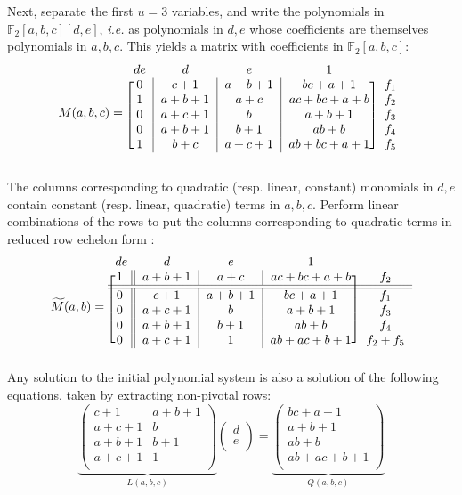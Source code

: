 \documentclass[twoside,leqno]{article}
\begin{document}
Next, separate the first $u=3$ variables, and write the polynomials in
$\mathbb{F}_2[a,b,c][d,e]$, \textit{i.e.} as polynomials in $d, e$ whose
coefficients are themselves polynomials in $a, b, c$. This yields a matrix with
coefficients in $\mathbb{F}_2[a,b,c]$:
\begin{equation}
\label{eq:example_matrix}
M(a,b,c) = \begin{blockarray}{ccccc}
de & d & e & 1 & \\
\begin{block}{[c|c|c|c]c}
0 & c+1 & a+b+1 & bc + a + 1 & f_1\\
1 & a+b+1 & a+c  & ac +bc + a+b & f_2\\
0 & a+c+1 & b & a+b+1          & f_3 \\
0 & a+b+1 & b+1 & ab+b  & f_4 \\
1 & b+c & a+c+1 & ab+bc+a+1 & f_5 \\
\end{block}
\end{blockarray}
\end{equation}

The columns corresponding to quadratic (resp. linear, constant) monomials in
$d,e$ contain constant (resp. linear, quadratic) terms in $a,b,c$. Perform
linear combinations of the rows to put the columns corresponding to quadratic
terms in reduced row echelon form :
\[
\widetilde M(a,b) = \begin{blockarray}{ccccc}
de & d & e & 1 & \\
\begin{block}{[c||c|c|c]c}
1 & a+b+1 & a+c     & ac +bc+a+b & f_2\\
\BAhline\BAhline
0 & c+1 & a+b+1 & bc + a + 1 & f_1\\
0 & a+c+1 & b & a+b+1          & f_3 \\
0 & a+b+1 & b+1 & ab+b  & f_4 \\
0 & a+c+1 & 1 & ab+ac +b+1 & f_2 + f_5 \\
\end{block}
\end{blockarray}
\]
Any solution to the initial polynomial system is also a solution of the
following equations, taken by extracting non-pivotal rows:
\[
\underbrace{\begin{pmatrix}
  c+1   & a+b+1 \\
  a+c+1 & b     \\
  a+b+1 & b+1   \\
  a+c+1 & 1     \\
  \end{pmatrix}}_{L(a,b,c)}
\begin{pmatrix}
d \\
e\\
\end{pmatrix}
=
\underbrace{\begin{pmatrix}
  bc + a + 1 \\       
  a + b + 1 \\  
  ab + b  \\             
  ab + ac + b + 1 \\
  \end{pmatrix}}_{Q(a,b,c)}
\]
\end{document}
